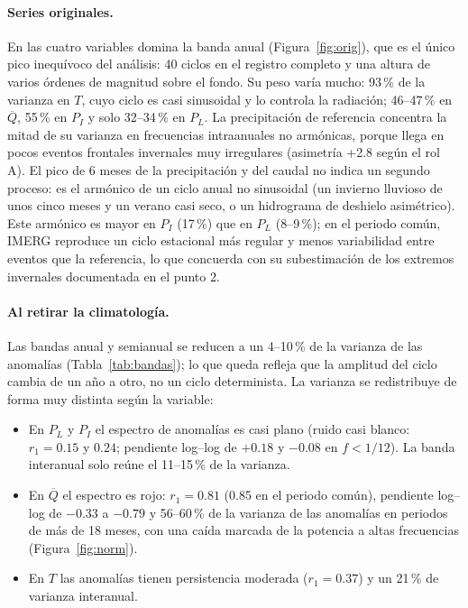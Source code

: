 \documentclass[11pt,letterpaper]{article}
\begin{document}
\paragraph{Series originales.} En las cuatro variables domina la banda anual (Figura~\ref{fig:orig}), que es el
único pico inequívoco del análisis: 40 ciclos en el registro completo y una altura de varios órdenes de
magnitud sobre el fondo. Su peso varía mucho: 93\,\% de la varianza en $T$, cuyo ciclo es casi sinusoidal y lo
controla la radiación; 46--47\,\% en $\overline{Q}$, 55\,\% en $P_I$ y solo 32--34\,\% en $P_L$. La precipitación de
referencia concentra la mitad de su varianza en frecuencias intraanuales no armónicas, porque llega en pocos
eventos frontales invernales muy irregulares (asimetría +2.8 según el rol A). El pico de 6 meses de la
precipitación y del caudal no indica un segundo proceso: es el armónico de un ciclo anual no sinusoidal (un
invierno lluvioso de unos cinco meses y un verano casi seco, o un hidrograma de deshielo asimétrico). Este
armónico es mayor en $P_I$ (17\,\%) que en $P_L$ (8--9\,\%); en el periodo común, IMERG reproduce un ciclo
estacional más regular y menos variabilidad entre eventos que la referencia, lo que concuerda con su
subestimación de los extremos invernales documentada en el punto 2.

\paragraph{Al retirar la climatología.} Las bandas anual y semianual se reducen a un 4--10\,\% de la varianza
de las anomalías (Tabla~\ref{tab:bandas}); lo que queda refleja que la amplitud del ciclo cambia de un año a
otro, no un ciclo determinista. La varianza se redistribuye de forma muy distinta según la variable:
\begin{itemize}
\item En $P_L$ y $P_I$ el espectro de anomalías es casi plano (ruido casi blanco: $r_1=0.15$ y $0.24$; pendiente
log--log de $+0.18$ y $-0.08$ en $f<1/12$). La banda interanual solo reúne el 11--15\,\% de la varianza.
\item En $\overline{Q}$ el espectro es rojo: $r_1=0.81$ (0.85 en el periodo común), pendiente log--log de $-0.33$ a
$-0.79$ y 56--60\,\% de la varianza de las anomalías en periodos de más de 18 meses, con una caída marcada de
la potencia a altas frecuencias (Figura~\ref{fig:norm}).
\item En $T$ las anomalías tienen persistencia moderada ($r_1=0.37$) y un 21\,\% de varianza interanual.
\end{itemize}
\end{document}

